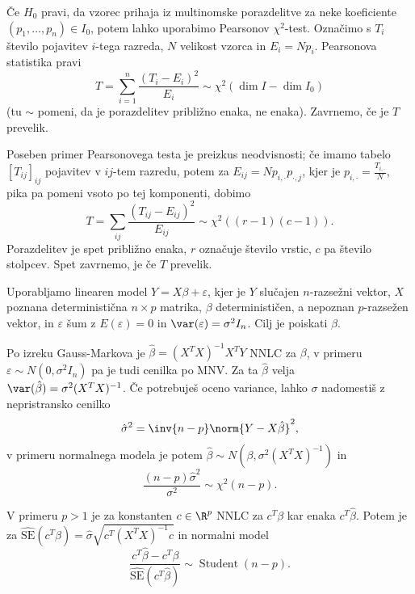 Če $H_0$ pravi, da vzorec prihaja iz multinomske porazdelitve za neke
koeficiente $(p_1, \ldots, p_n) \in I_0$, potem lahko uporabimo Pearsonov
$\chi^2$-test.
Označimo s $T_i$ število pojavitev $i$-tega razreda, $N$ velikost vzorca in $E_i
= N p_i$.
Pearsonova statistika pravi
\[
  T = \sum_{i=1}^n \frac{(T_i - E_i)^2}{E_i} \sim \chi^2(\dim I - \dim I_0)
\]
(tu $\sim$ pomeni, da je porazdelitev približno enaka, ne enaka).
Zavrnemo, če je $T$ prevelik.

Poseben primer Pearsonovega testa je preizkus neodvisnosti; če imamo tabelo
$[T_{ij}]_{ij}$ pojavitev v $ij$-tem razredu, potem za $E_{ij} = N p_{i, \cdot}
p_{\cdot, j}$, kjer je $p_{i,\cdot} = \frac{T_{i,\cdot}}{N}$, pika pa pomeni
vsoto po tej komponenti, dobimo
\[
  T = \sum_{ij} \frac{(T_{ij} - E_{ij})^2}{E_{ij}}
  \sim \chi^2((r-1) (c-1)).
\]
Porazdelitev je spet približno enaka, $r$ označuje število vrstic, $c$ pa
število stolpcev.
Spet zavrnemo, je če $T$ prevelik.


Uporabljamo linearen model $Y = X \beta + \varepsilon$, kjer je $Y$ slučajen
$n$-razsežni vektor, $X$ poznana deterministična $n \times p$ matrika, $\beta$
determinističen, a nepoznan $p$-razsežen vektor, in $\varepsilon$ šum z
$E(\varepsilon) = 0$ in $\var(\varepsilon) = \sigma^2 I_n$.
Cilj je poiskati $\beta$.

Po izreku Gauss-Markova je $\hat{\beta} = (X^T X)^{-1} X^T Y$ NNLC za $\beta$, v
primeru $\varepsilon \sim N(0, \sigma^2 I_n)$ pa je tudi cenilka po MNV.
Za ta $\hat{\beta}$ velja $\var(\hat{\beta}) = \sigma^2 (X^TX)^{-1}$.
Če potrebuješ oceno variance, lahko $\sigma$ nadomestiš z nepristransko cenilko
\[
  \hat{\sigma}^2 = \inv{n-p} \norm{Y - X \hat{\beta}}^2,
\]
v primeru normalnega modela je potem $\hat{\beta}\sim N(\beta, \sigma^2 (X^T
X)^{-1})$ in
\[
  \frac{(n-p) \hat{\sigma}^2}{\sigma^2} \sim \chi^2(n-p).
\]

V primeru $p > 1$ je za konstanten $c \in \R^p$ NNLC za $c^T \beta$ kar enaka
$c^T \hat{\beta}$.
Potem je za $\hat{\text{SE}}(c^T \hat{\beta}) = \hat{\sigma} \sqrt{c^T (X^T
  X)^{-1} c}$ in normalni model
\[
  \frac{c^T \hat{\beta} - c^T \beta}{\hat{\text{SE}}(c^T \hat{\beta})}
  \sim \operatorname{Student}(n-p).
\]

